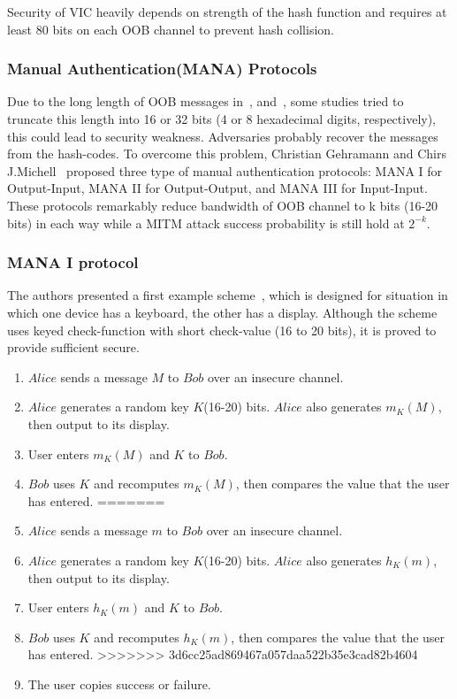 Security of VIC heavily depends on strength of the hash function and requires at least 80 bits on each OOB channel to prevent hash collision. 
 
\subsubsection{Manual Authentication(MANA) Protocols}

Due to the long length of OOB messages in~\cite{1624021}, and~\cite{Smetters02talkingto}, some studies tried to truncate this length into 16 or 32 bits (4 or 8 hexadecimal digits, respectively), this could lead to security weakness. Adversaries probably recover the messages from the hash-codes. To overcome this problem, Christian Gehramann and Chirs J.Michell~\cite{Mitchell:2004p25948} proposed three type of manual authentication protocols: MANA I for Output-Input, MANA II for Output-Output, and MANA III for Input-Input. These protocols remarkably reduce bandwidth of OOB channel to k bits (16-20 bits) in each way while a MITM attack success probability is still hold at $2^{-k}$. 

\subsubsection*{MANA I protocol}

The authors presented a first example scheme~\cite{Mitchell:2004p25948}, which is designed for situation in which one device has a keyboard, the other has a display. Although the scheme uses keyed check-function with short check-value (16 to 20 bits), it is proved to provide sufficient secure. 

\begin{enumerate}
<<<<<<< HEAD
\item $Alice$ sends a message $M$ to $Bob$ over an insecure channel. 
\item $Alice$ generates a random key $K$(16-20) bits. $Alice$ also generates $m_K(M)$, then output to its display.
\item User enters $m_K(M)$ and $K$ to $Bob$.
\item $Bob$ uses $K$ and recomputes $m_K(M)$, then compares the value that the user has entered.
=======
\item $Alice$ sends a message $m$ to $Bob$ over an insecure channel. 
\item $Alice$ generates a random key $K$(16-20) bits. $Alice$ also generates $h_K(m)$, then output to its display.
\item User enters $h_K(m)$ and $K$ to $Bob$.
\item $Bob$ uses $K$ and recomputes $h_K(m)$, then compares the value that the user has entered.
>>>>>>> 3d6cc25ad869467a057daa522b35e3cad82b4604
\item The user copies success or failure. 
\end{enumerate}


